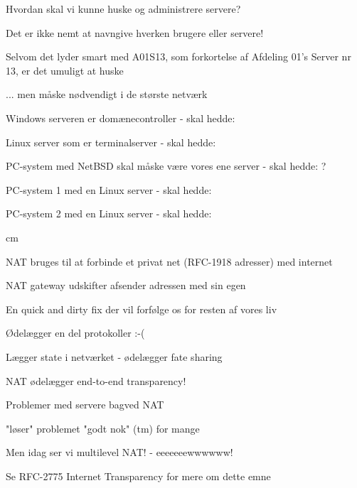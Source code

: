 \documentclass[Screen16to9,17pt,footrule]{foils}
\begin{document}
\begin{list1}
  \item Hvordan skal vi kunne huske og administrere servere?
\item Det er ikke nemt at navngive hverken brugere eller servere!
\item Selvom det lyder smart med A01S13, som forkortelse af Afdeling
  01's Server nr 13, er det umuligt at huske
\item ... men måske nødvendigt i de største netværk
  \begin{list2}

\item Windows serveren er domænecontroller - skal hedde:
\item Linux server som er terminalserver - skal hedde:
\item PC-system med NetBSD skal måske være vores ene server - skal hedde: ?
\item PC-system 1 med en Linux server - skal hedde:
\item PC-system 2 med en Linux server - skal hedde:
  \end{list2}
\end{list1}





 cm
\begin{list2}
\item NAT bruges til at forbinde et privat net (RFC-1918 adresser) med internet
\item NAT gateway udskifter afsender adressen med sin egen
\item En quick and dirty fix der vil forfølge os for resten af vores
  liv
\item Ødelægger en del protokoller :-(
\item Lægger state i netværket - ødelægger fate sharing
\end{list2}








\begin{list2}
\item NAT ødelægger end-to-end transparency!
\item Problemer med servere bagved NAT
\item "løser" problemet "godt nok" (tm) for mange
\item Men idag ser vi multilevel NAT! - eeeeeeewwwwww!
\item Se RFC-2775 Internet Transparency for mere om dette emne
\end{list2}
\end{document}
